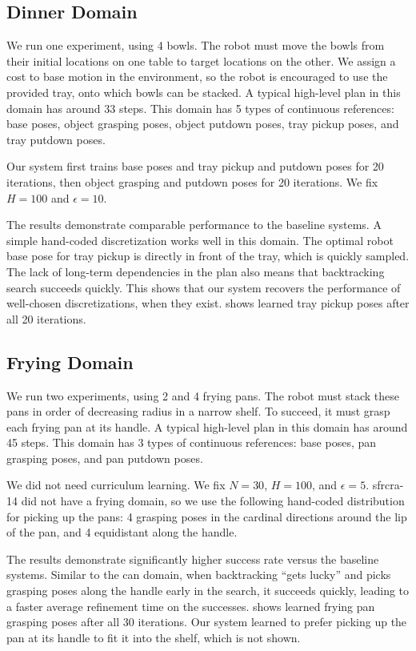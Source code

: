 \subsection{Dinner Domain}
We run one experiment, using 4 bowls. The robot must
move the bowls from their initial locations on one table to target
locations on the other. We assign a cost to base motion in the
environment, so the robot is encouraged to use the provided tray, onto
which bowls can be stacked. A typical high-level plan in this domain has around 33 steps.
This domain has 5 types of continuous
references: base poses, object grasping poses, object putdown poses,
tray pickup poses, and tray putdown poses.

Our system first trains base poses and tray pickup
and putdown poses for 20 iterations, then object grasping and putdown
poses for 20 iterations. We fix $H = 100$ and $\epsilon = 10$.

The results demonstrate comparable performance to the baseline
systems. A simple hand-coded discretization works well in
this domain. The optimal robot base pose for tray pickup
is directly in front of the tray, which is quickly sampled.
The lack of long-term
dependencies in the plan also means that backtracking search succeeds
quickly. This shows that our system recovers the performance of
well-chosen discretizations, when they exist.  shows learned tray
pickup poses after all 20 iterations.

\subsection{Frying Domain}
We run two experiments, using 2 and 4 frying pans. The robot
must stack these pans in order of decreasing radius in a narrow
shelf. To succeed, it must grasp each frying pan at its handle.
A typical high-level plan in this domain has around 45 steps.
This domain has 3 types of continuous references: base poses,
pan grasping poses, and pan putdown poses.

We did not need curriculum learning. We fix $N = 30$, $H = 100$, and
$\epsilon = 5$. {\sc sfrcra-14} did not have a frying domain, so we
use the following hand-coded distribution for picking up the pans: 4
grasping poses in the cardinal directions around the lip of the pan,
and 4 equidistant along the handle.

The results demonstrate significantly higher success rate versus the
baseline systems. Similar to the can domain, when backtracking ``gets lucky'' and
picks grasping poses along the handle early in the search, it succeeds quickly, leading
to a faster average refinement time on the successes.
 shows learned frying pan grasping poses
after all 30 iterations. Our system learned to prefer picking up the
pan at its handle to fit it into the shelf, which is not shown.






